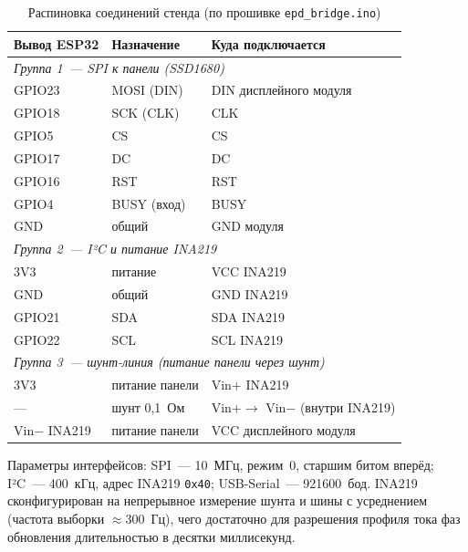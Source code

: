 \begin{table}[H]
    \centering
    \caption{Распиновка соединений стенда (по прошивке \texttt{epd\_bridge.ino})}
    \label{tab:pinout}
    \small
    \begin{tabular}{lll}
        \toprule
        Вывод ESP32 & Назначение & Куда подключается \\
        \midrule
        \multicolumn{3}{l}{\emph{Группа 1~--- SPI к панели (SSD1680)}} \\
        GPIO23 & MOSI (DIN)    & DIN дисплейного модуля \\
        GPIO18 & SCK (CLK)     & CLK \\
        GPIO5  & CS            & CS \\
        GPIO17 & DC            & DC \\
        GPIO16 & RST           & RST \\
        GPIO4  & BUSY (вход)   & BUSY \\
        GND    & общий         & GND модуля \\
        \midrule
        \multicolumn{3}{l}{\emph{Группа 2~--- I²C и питание INA219}} \\
        3V3    & питание       & VCC INA219 \\
        GND    & общий         & GND INA219 \\
        GPIO21 & SDA           & SDA INA219 \\
        GPIO22 & SCL           & SCL INA219 \\
        \midrule
        \multicolumn{3}{l}{\emph{Группа 3~--- шунт-линия (питание панели через шунт)}} \\
        3V3    & питание панели & Vin$+$ INA219 \\
        --- & шунт 0,1~Ом & Vin$+ \to$ Vin$-$ (внутри INA219) \\
        Vin$-$ INA219 & питание панели & VCC дисплейного модуля \\
        \bottomrule
    \end{tabular}
\end{table}

\noindent Параметры интерфейсов: SPI~--- 10~МГц, режим~0, старшим битом вперёд;
I²C~--- 400~кГц, адрес INA219 \texttt{0x40}; USB-Serial~--- 921600~бод. INA219
сконфигурирован на непрерывное измерение шунта и шины с усреднением (частота
выборки $\approx300$~Гц), чего достаточно для разрешения профиля тока фаз
обновления длительностью в десятки миллисекунд.
